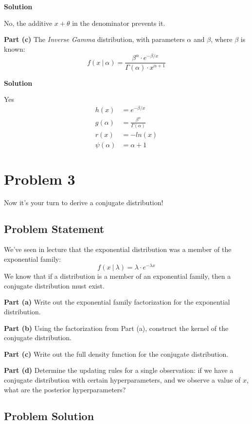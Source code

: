 \documentclass[12pt]{article}
\theoremstyle{definition}
\begin{document}
\bigskip
\noindent
{\bf Solution}

No, the additive $x + \theta$ in the denominator prevents it.

\vspace{0.5in}
\noindent
{\bf Part (c)} The {\em Inverse Gamma} distribution, with parameters $\alpha$ and $\beta$, where $\beta$ is known:
$$
f(x\ |\ \alpha) = \frac{ \beta^\alpha \cdot e^{-\beta/x} }{\Gamma(\alpha) \cdot x^{\alpha + 1} }
$$

\bigskip
\noindent
{\bf Solution}

Yes
\begin{align*}
h(x) &= e^{-\beta/x}\\
g(\alpha) &= \frac{\beta^\alpha}{\Gamma(\alpha)}\\
r(x) &= -ln(x)\\
\psi(\alpha) &= \alpha + 1
\end{align*}


\newpage
\section*{Problem 3}

Now it's your turn to derive a conjugate distribution!

\subsection*{Problem Statement}

We've seen in lecture that the exponential distribution was a member of the exponential family:
$$
f(x\ |\ \lambda) = \lambda \cdot e^{-\lambda x}
$$
We know that if a distribution is a member of an exponential family, then a conjugate distribution must exist.

\bigskip
\noindent
{\bf Part (a)} Write out the exponential family factorization for the exponential distribution.

\bigskip
\noindent
{\bf Part (b)} Using the factorization from Part (a), construct the kernel of the conjugate distribution.

\bigskip
\noindent
{\bf Part (c)} Write out the full density function for the conjugate distribution.


\bigskip
\noindent
{\bf Part (d)} Determine the updating rules for a single observation: if we have a conjugate distribution with certain hyperparameters, and we observe a value of $x$, what are the posterior hyperparameters? 


\subsection*{Problem Solution}
\end{document}
